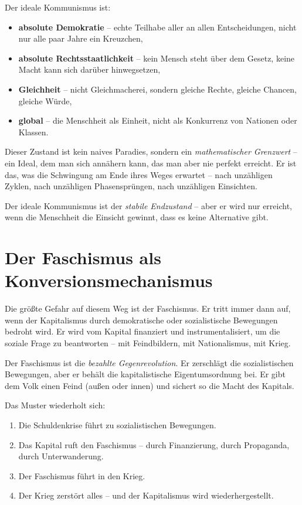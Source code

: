 \documentclass[12pt,a4paper]{book}
\begin{document}
Der ideale Kommunismus ist:

\begin{itemize}
    \item \textbf{absolute Demokratie} – echte Teilhabe aller an allen Entscheidungen, nicht nur alle paar Jahre ein Kreuzchen,
    \item \textbf{absolute Rechtsstaatlichkeit} – kein Mensch steht über dem Gesetz, keine Macht kann sich darüber hinwegsetzen,
    \item \textbf{Gleichheit} – nicht Gleichmacherei, sondern gleiche Rechte, gleiche Chancen, gleiche Würde,
    \item \textbf{global} – die Menschheit als Einheit, nicht als Konkurrenz von Nationen oder Klassen.
\end{itemize}

Dieser Zustand ist kein naives Paradies, sondern ein \emph{mathematischer Grenzwert} – ein Ideal, dem man sich annähern kann, das man aber nie perfekt erreicht. Er ist das, was die Schwingung am Ende ihres Weges erwartet – nach unzähligen Zyklen, nach unzähligen Phasensprüngen, nach unzähligen Einsichten.

Der ideale Kommunismus ist der \emph{stabile Endzustand} – aber er wird nur erreicht, wenn die Menschheit die Einsicht gewinnt, dass es keine Alternative gibt.

\chapter{Der Faschismus als Konversionsmechanismus}

Die größte Gefahr auf diesem Weg ist der Faschismus. Er tritt immer dann auf, wenn der Kapitalismus durch demokratische oder sozialistische Bewegungen bedroht wird. Er wird vom Kapital finanziert und instrumentalisiert, um die soziale Frage zu beantworten – mit Feindbildern, mit Nationalismus, mit Krieg.

Der Faschismus ist die \emph{bezahlte Gegenrevolution}. Er zerschlägt die sozialistischen Bewegungen, aber er behält die kapitalistische Eigentumsordnung bei. Er gibt dem Volk einen Feind (außen oder innen) und sichert so die Macht des Kapitals.

Das Muster wiederholt sich:

\begin{enumerate}
    \item Die Schuldenkrise führt zu sozialistischen Bewegungen.
    \item Das Kapital ruft den Faschismus – durch Finanzierung, durch Propaganda, durch Unterwanderung.
    \item Der Faschismus führt in den Krieg.
    \item Der Krieg zerstört alles – und der Kapitalismus wird wiederhergestellt.
\end{enumerate}
\end{document}
